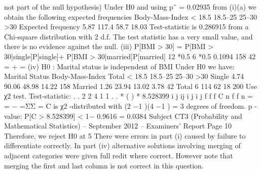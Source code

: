              not part of the null hypothesis)
Under H0 and using pˆ = 0.02935 from (i)(a) we obtain the following
expected frequencies
Body-Mass-Index < 18.5 18.5–25 25–30 >30
Expected frequency 5.87 117.4 58.7 18.03
Test-statistic is 0.286915
from a Chi-square distribution with 2 d.f.
The test statistic has a very small value, and there is no evidence against the
null.
(iii) P[BMI > 30]
= P[BMI > 30|single]P[single]+ P[BMI > 30|married]P[married]
12 *0.5 6 *0.5 0.1094
158 42
= + =
  (iv) H0 : Marital status is independent of BMI
Under H0 we have:
  Marital Status Body-Mass-Index Total
< 18.5 18.5–25 25–30 >30
Single 4.74 90.06 48.98 14.22 158
Married 1.26 23.94 13.02 3.78 42
Total 6 114 62 18 200
Use χ2 test.
Test-statistic:
  . . 2 2 4
1 1 . .
*
  ( )
* 8.528399
i j
ij
i j i j
f f
f
C n f f
n
= =
  −
=ΣΣ =
  C is χ2 -distributed with (2 −1 )(4 −1 ) = 3 degrees of freedom.
p -value: P[C > 8.528399] < 1− 0.9616 = 0.0384
Subject CT3 (Probability and Mathematical Statistics) – September 2012 – Examiners’ Report
Page 10
Therefore, we reject H0 at 5%
There were errors in part (i) caused by failure to differentiate correctly. In part (iv)
alternative solutions involving merging of adjacent categories were given full redit where
correct. However note that merging the first and last column is not correct in this question.
